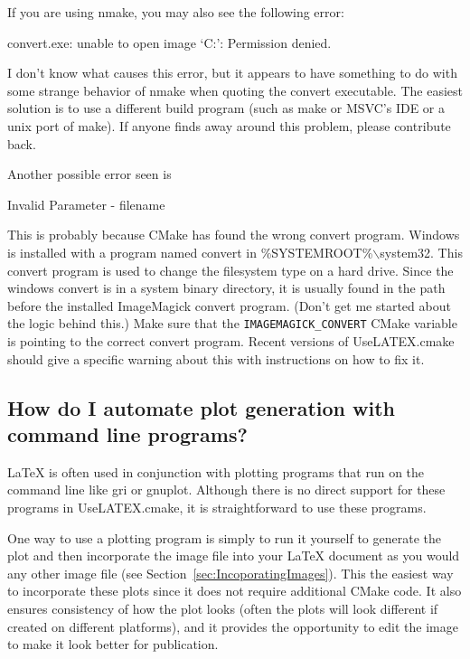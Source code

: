\documentclass{article}
\newcommand*{\textfile}[1]{\textsf{#1}}
\newcommand*{\textprog}[1]{\textfile{#1}}
\newcommand*{\textcmake}[1]{\texttt{#1}}
\newcommand*{\textcmakevar}[1]{\textcmake{#1}}
\newcommand*{\UseLATEX}{\textfile{UseLATEX.cmake}\xspace}
\newcommand*{\latex}{\LaTeX\xspace}
\begin{document}
  If you are using nmake, you may also see the following error: 

  \begin{CodeListing}
convert.exe: unable to open image `C:': Permission denied.
  \end{CodeListing}

  I don't know what causes this error, but it appears to have something to
  do with some strange behavior of nmake when quoting the convert
  executable. The easiest solution is to use a different build program
  (such as make or MSVC's IDE or a unix port of make). If anyone finds away
  around this problem, please contribute back.

  Another possible error seen is

  \begin{CodeListing}
Invalid Parameter - filename
  \end{CodeListing}

  This is probably because CMake has found the wrong \textprog{convert}
  program. Windows is installed with a program named \textprog{convert} in
  \textfile{\%SYSTEMROOT\%$\backslash$system32}. This \textprog{convert}
  program is used to change the filesystem type on a hard drive. Since the
  windows \textfile{convert} is in a system binary directory, it is usually
  found in the path before the installed ImageMagick \textfile{convert}
  program. (Don't get me started about the logic behind this.) Make sure
  that the \textcmakevar{IMAGEMAGICK\_CONVERT} CMake variable is pointing
  to the correct \textprog{convert} program. Recent versions of \UseLATEX
  should give a specific warning about this with instructions on how to fix
  it.

  \subsection{How do I automate plot generation with command line programs?}
  \label{How_do_I_automate_plot_generation_with_command_line_programs}

  \latex is often used in conjunction with plotting programs that run on
  the command line like \textprog{gri} or \textprog{gnuplot}.  Although
  there is no direct support for these programs in \UseLATEX, it is
  straightforward to use these programs.

  One way to use a plotting program is simply to run it yourself to
  generate the plot and then incorporate the image file into your \latex
  document as you would any other image file (see
  Section~\ref{sec:IncoporatingImages}).  This the easiest way to
  incorporate these plots since it does not require additional CMake code.
  It also ensures consistency of how the plot looks (often the plots will
  look different if created on different platforms), and it provides the
  opportunity to edit the image to make it look better for publication.
\end{document}
